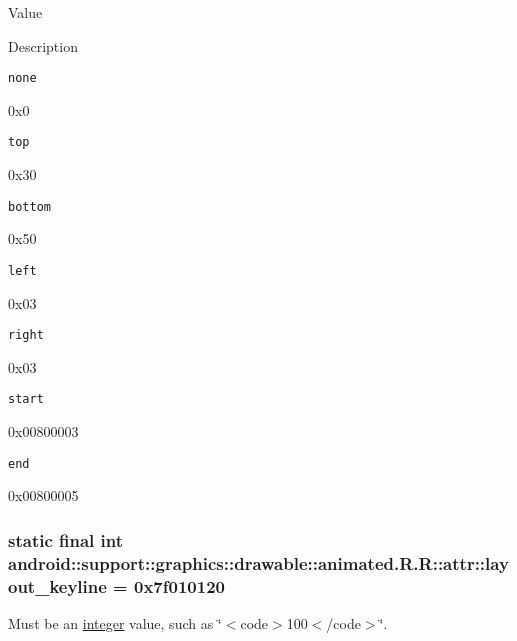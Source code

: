 Value

Description 

{\tt none}

0x0

{\tt top}

0x30

{\tt bottom}

0x50

{\tt left}

0x03

{\tt right}

0x03

{\tt start}

0x00800003

{\tt end}

0x00800005\hypertarget{classandroid_1_1support_1_1graphics_1_1drawable_1_1animated_1_1_r_1_1attr_ab80ad28577eee78dd8ec7897ff5a1c5}{
\subsubsection[{layout\_\-keyline}]{\setlength{\rightskip}{0pt plus 5cm}static final int android::support::graphics::drawable::animated.R.R::attr::layout\_\-keyline = 0x7f010120}}
\label{classandroid_1_1support_1_1graphics_1_1drawable_1_1animated_1_1_r_1_1attr_ab80ad28577eee78dd8ec7897ff5a1c5}


Must be an \hyperlink{classandroid_1_1support_1_1graphics_1_1drawable_1_1animated_1_1_r_1_1integer}{integer} value, such as \char`\"{}$<$code$>$100$<$/code$>$\char`\"{}. 

